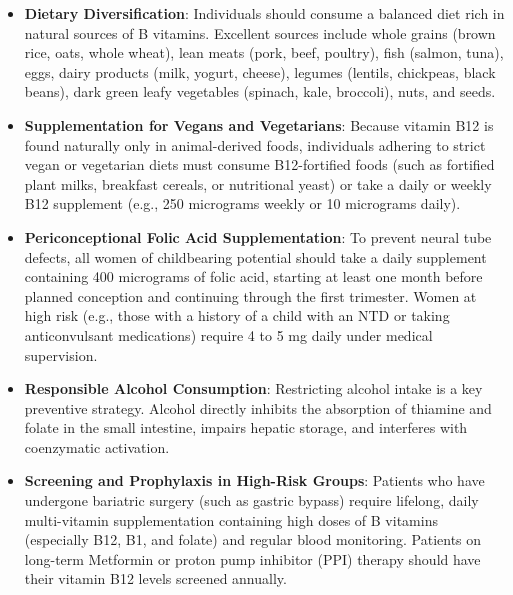 \begin{itemize}
    \item \textbf{Dietary Diversification}: Individuals should consume a balanced diet rich in natural sources of B vitamins. Excellent sources include whole grains (brown rice, oats, whole wheat), lean meats (pork, beef, poultry), fish (salmon, tuna), eggs, dairy products (milk, yogurt, cheese), legumes (lentils, chickpeas, black beans), dark green leafy vegetables (spinach, kale, broccoli), nuts, and seeds.
    \item \textbf{Supplementation for Vegans and Vegetarians}: Because vitamin B12 is found naturally only in animal-derived foods, individuals adhering to strict vegan or vegetarian diets must consume B12-fortified foods (such as fortified plant milks, breakfast cereals, or nutritional yeast) or take a daily or weekly B12 supplement (e.g., 250 micrograms weekly or 10 micrograms daily).
    \item \textbf{Periconceptional Folic Acid Supplementation}: To prevent neural tube defects, all women of childbearing potential should take a daily supplement containing 400 micrograms of folic acid, starting at least one month before planned conception and continuing through the first trimester. Women at high risk (e.g., those with a history of a child with an NTD or taking anticonvulsant medications) require 4 to 5 mg daily under medical supervision.
    \item \textbf{Responsible Alcohol Consumption}: Restricting alcohol intake is a key preventive strategy. Alcohol directly inhibits the absorption of thiamine and folate in the small intestine, impairs hepatic storage, and interferes with coenzymatic activation.
    \item \textbf{Screening and Prophylaxis in High-Risk Groups}: Patients who have undergone bariatric surgery (such as gastric bypass) require lifelong, daily multi-vitamin supplementation containing high doses of B vitamins (especially B12, B1, and folate) and regular blood monitoring. Patients on long-term Metformin or proton pump inhibitor (PPI) therapy should have their vitamin B12 levels screened annually.
\end{itemize}


